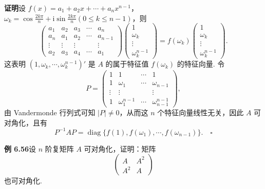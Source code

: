 \documentclass[UTF8,12pt,a4paper,fontset=fandol]{ctexart}
\begin{document}
\noindent\textbf{证明}\quad 设 $f(x)=a_1+a_2x+\cdots+a_nx^{n-1}$，$\omega_k=\cos\frac{2k\pi}{n}+\mathrm{i}\sin\frac{2k\pi}{n}(0\le k\le n-1)$，则
\[
\left(\begin{array}{ccccc}
a_1 & a_2 & a_3 & \cdots & a_n\\
a_n & a_1 & a_2 & \cdots & a_{n-1}\\
\vdots & \vdots & \vdots & & \vdots\\
a_2 & a_3 & a_4 & \cdots & a_1
\end{array}\right)
\left(\begin{array}{c}
1\\
\omega_k\\
\vdots\\
\omega_k^{n-1}
\end{array}\right)
=f(\omega_k)\left(\begin{array}{c}
1\\
\omega_k\\
\vdots\\
\omega_k^{n-1}
\end{array}\right).
\]
这表明 $(1,\omega_k,\cdots,\omega_k^{n-1})'$ 是 $A$ 的属于特征值 $f(\omega_k)$ 的特征向量. 令
\[
P=\left(\begin{array}{cccc}
1 & 1 & \cdots & 1\\
1 & \omega_1 & \cdots & \omega_{n-1}\\
\vdots & \vdots & & \vdots\\
1 & \omega_1^{n-1} & \cdots & \omega_{n-1}^{n-1}
\end{array}\right),
\]
由 Vandermonde 行列式可知 $|P|\ne 0$，从而这 $n$ 个特征向量线性无关，因此 $A$ 可对角化，且有
\[
P^{-1}AP=\operatorname{diag}\{f(1),f(\omega_1),\cdots,f(\omega_{n-1})\}. \quad \square
\]

\noindent\textbf{例 6.56}\quad 设 $n$ 阶复矩阵 $A$ 可对角化，证明：矩阵
\[
\left(\begin{array}{cc}
A & A^2\\
A^2 & A
\end{array}\right)
\]
也可对角化.
\end{document}

